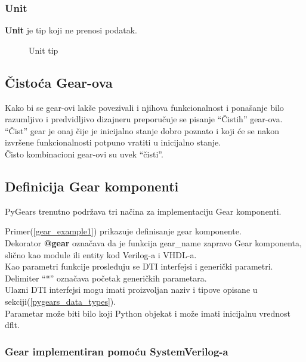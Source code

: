 \subsubsection{Unit} \label{unit_sec}
\textbf{Unit} je tip koji ne prenosi podatak.

\begin{figure}[H]
\centering{
  \scalebox{1.2}{
    
  }}
\caption{Unit tip}
\label{unit_img1}
\end{figure}

\subsection{Čistoća Gear-ova} \label{gear_purity}

Kako bi se gear-ovi lakše povezivali i njihova funkcionalnost i ponašanje bilo
razumljivo i predvidljivo dizajneru preporučuje se pisanje ``Čistih''  gear-ova. \\
``Čist'' gear je onaj čije je inicijalno stanje dobro poznato i koji će se nakon
izvršene funkcionalnosti potpuno vratiti u inicijalno stanje. \\
Čisto kombinacioni gear-ovi su uvek ``čisti''.

\subsection{Definicija Gear komponenti}

PyGears trenutno podržava tri načina za implementaciju Gear komponenti.



Primer(\ref{gear_example1}) prikazuje definisanje gear komponente. \\
Dekorator \textbf{@gear} označava da je funkcija gear\_name zapravo Gear komponenta,
slično kao module ili entity kod Verilog-a i VHDL-a. \\
Kao parametri funkcije prosleđuju se DTI interfejsi i generički parametri.
Delimiter ``*'' označava početak generičkih parametara. \\

Ulazni DTI interfejsi mogu imati proizvoljan naziv i tipove opisane u
sekciji(\ref{pygears_data_types}). \\
Parametar može biti bilo koji Python objekat i može imati inicijalnu vrednost dflt.

\subsubsection{Gear implementiran pomoću SystemVerilog-a}

